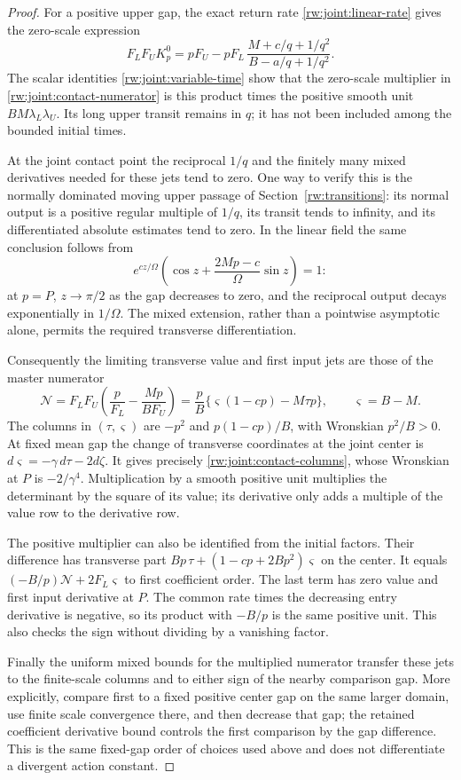 \begin{proof}
For a positive upper gap, the exact return rate
\eqref{rw:joint:linear-rate} gives the zero-scale expression
\[
 F_LF_U K_p^0
 =pF_U-pF_L\,
        \frac{M+c/q+1/q^2}{B-a/q+1/q^2}.
\]
The scalar identities \eqref{rw:joint:variable-time} show that
the zero-scale multiplier in \eqref{rw:joint:contact-numerator}
is this product times the positive smooth unit
$BM\lambda_L\lambda_U$. Its long upper transit remains in $q$;
it has not been included among the bounded initial times.

At the joint contact point the reciprocal $1/q$ and the finitely
many mixed derivatives needed for these jets tend to zero.
One way to verify this is the normally dominated moving upper
passage of Section~\ref{rw:transitions}: its normal output is a
positive regular multiple of $1/q$, its transit tends to infinity,
and its differentiated absolute estimates tend to zero. In the
linear field the same conclusion follows from
\[
 e^{cz/\Omega}
 \left(\cos z+\frac{2Mp-c}{\Omega}\sin z\right)=1:
\]
at $p=P$, $z\to\pi/2$ as the gap decreases to zero, and the
reciprocal output decays exponentially in $1/\Omega$.
The mixed extension, rather than a pointwise asymptotic alone,
permits the required transverse differentiation.

Consequently the limiting transverse value and first input jets
are those of the master numerator
\begin{equation}\label{rw:joint:master}
 \mathscr N
 =F_LF_U\left(\frac p{F_L}-\frac{Mp}{BF_U}\right)
 =\frac pB\{\varsigma(1-cp)-M\tau p\},
 \qquad\varsigma=B-M.
\end{equation}
The columns in $(\tau,\varsigma)$ are
$-p^2$ and $p(1-cp)/B$, with Wronskian $p^2/B>0$.
At fixed mean gap the change of transverse coordinates at the
joint center is
$d\varsigma=-\gamma\,d\tau-2d\zeta$.
It gives precisely \eqref{rw:joint:contact-columns}, whose
Wronskian at $P$ is $-2/\gamma^4$.
Multiplication by a smooth positive unit multiplies the determinant
by the square of its value; its derivative only adds a multiple of
the value row to the derivative row.

The positive multiplier can also be identified from the initial
factors. Their difference has transverse part
$Bp\,\tau+(1-cp+2Bp^2)\varsigma$ on the center. It equals
$(-B/p)\mathscr N+2F_L\varsigma$ to first coefficient order.
The last term has zero value and first input derivative at $P$.
The common rate times the decreasing entry derivative is negative,
so its product with $-B/p$ is the same positive unit. This also
checks the sign without dividing by a vanishing factor.

Finally the uniform mixed bounds for the multiplied numerator
transfer these jets to the finite-scale columns and to either sign
of the nearby comparison gap. More explicitly, compare first to a
fixed positive center gap on the same larger domain, use finite
scale convergence there, and then decrease that gap; the retained
coefficient derivative bound controls the first comparison by the
gap difference. This is the same fixed-gap order of choices used
above and does not differentiate a divergent action constant.
\end{proof}

